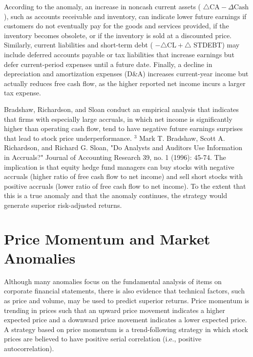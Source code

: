 \documentclass[11pt]{article}
\begin{document}
According to the anomaly, an increase in noncash current assets ( $\triangle \mathrm{CA}-\Delta \mathrm{Cash}$ ), such as accounts receivable and inventory, can indicate lower future earnings if customers do not eventually pay for the goods and services provided, if the inventory becomes obsolete, or if the inventory is sold at a discounted price. Similarly, current liabilities and short-term debt ( $-\triangle \mathrm{CL}+\triangle$ STDEBT) may include deferred accounts payable or tax liabilities that increase earnings but defer current-period expenses until a future date. Finally, a decline in depreciation and amortization expenses (D\&A) increases current-year income but actually reduces free cash flow, as the higher reported net income incurs a larger tax expense.

Bradshaw, Richardson, and Sloan conduct an empirical analysis that indicates that firms with especially large accruals, in which net income is significantly higher than operating cash flow, tend to have negative future earnings surprises that lead to stock price underperformance. ${ }^{3}$ Mark T. Bradshaw, Scott A. Richardson, and Richard G. Sloan, "Do Analysts and Auditors Use Information in Accruals?" Journal of Accounting Research 39, no. 1 (1996): 45-74. The implication is that equity hedge fund managers can buy stocks with negative accruals (higher ratio of free cash flow to net income) and sell short stocks with positive accruals (lower ratio of free cash flow to net income). To the extent that this is a true anomaly and that the anomaly continues, the strategy would generate superior risk-adjusted returns.

\section*{Price Momentum and Market Anomalies}
Although many anomalies focus on the fundamental analysis of items on corporate financial statements, there is also evidence that technical factors, such as price and volume, may be used to predict superior returns. Price momentum is trending in prices such that an upward price movement indicates a higher expected price and a downward price movement indicates a lower expected price. A strategy based on price momentum is a trend-following strategy in which stock prices are believed to have positive serial correlation (i.e., positive autocorrelation).
\end{document}
